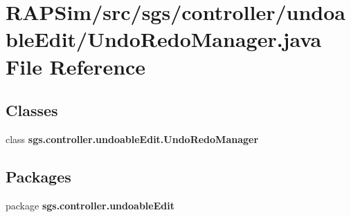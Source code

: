 \section{R\-A\-P\-Sim/src/sgs/controller/undoable\-Edit/\-Undo\-Redo\-Manager.java File Reference}
\label{_undo_redo_manager_8java}
\subsection*{Classes}
\begin{DoxyCompactItemize}
\item 
class {\bf sgs.\-controller.\-undoable\-Edit.\-Undo\-Redo\-Manager}
\end{DoxyCompactItemize}
\subsection*{Packages}
\begin{DoxyCompactItemize}
\item 
package {\bf sgs.\-controller.\-undoable\-Edit}
\end{DoxyCompactItemize}
